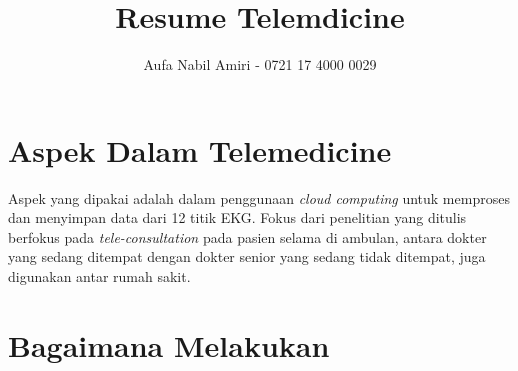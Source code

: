\documentclass[12pt, a4paper]{article}
\title{Resume Telemdicine}
\author{Aufa Nabil Amiri - 0721 17 4000 0029}
\date{}
\begin{document}
\maketitle

\section*{Aspek Dalam Telemedicine}
Aspek yang dipakai adalah dalam penggunaan \textit{cloud computing} untuk memproses dan menyimpan data dari 12 titik EKG. Fokus dari penelitian yang ditulis berfokus pada \textit{tele-consultation} pada pasien selama di ambulan, antara dokter yang sedang ditempat dengan dokter senior yang sedang tidak ditempat, juga digunakan antar rumah sakit.

\section*{Bagaimana Melakukan}
\end{document}
